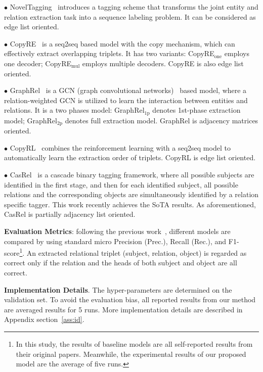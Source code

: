 \documentclass[11pt,a4paper]{article}
\begin{document}
$\bullet$ NovelTagging~\cite{zheng2017joint} introduces a tagging scheme that transforms the joint entity and relation extraction task into a sequence labeling problem. It can be considered as edge list oriented. 

$\bullet$ CopyRE~\cite{zeng2018extracting} is a seq2seq based model with the copy mechanism, which can effectively extract overlapping triplets. It has two variants: CopyRE$_\text{one}$ employs one decoder; CopyRE$_\text{mul}$ employs multiple decoders. CopyRE is also edge list oriented.

$\bullet$ GraphRel~\cite{fu2019graphrel} is a GCN (graph convolutional networks)~\cite{kipf2017semi} based model, where a relation-weighted GCN is utilized to learn the interaction between entities and relations. It is a two phases model: GraphRel$_\text{1p}$ denotes 1st-phase extraction model; GraphRel$_\text{2p}$ denotes full extraction model. GraphRel is adjacency matrices oriented. 

$\bullet$ CopyRL~\cite{zeng2019learning} combines the reinforcement learning with a seq2seq model to automatically learn the extraction order of triplets. CopyRL is edge list oriented. 

$\bullet$ CasRel~\cite{wei2020novel} is a cascade binary tagging framework, where all possible subjects are identiﬁed in the ﬁrst stage, and then for each identiﬁed subject, all possible relations and the corresponding objects are simultaneously identiﬁed by a relation speciﬁc tagger. This work recently achieves the SoTA results. As aforementioned, CasRel is partially adjacency list oriented.


\textbf{Evaluation Metrics}: following the previous work~\cite{zeng2018extracting,wei2020novel}, different models are compared by using standard micro Precision (Prec.), Recall (Rec.), and F1-score\footnote{In this study, the results of baseline models are all self-reported results from their original papers. Meanwhile, the experimental results of our proposed model are the average of five runs.}. An extracted relational triplet (subject, relation, object) is regarded as correct only if the relation and the heads of both subject and object are all correct.


\textbf{Implementation Details}. The hyper-parameters are determined on the validation set. To avoid the evaluation bias, all reported results from our method are averaged results for 5 runs. More implementation details are described in Appendix section~\ref{ass:id}.
\end{document}

